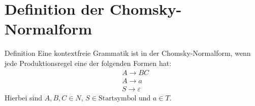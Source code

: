 \documentclass[t]{beamer}
\begin{document}
	\section{Definition der Chomsky-Normalform}\label{sec:chomsky-normal-form-definition}
	\begin{frame}
		\begin{block}{Definition\cite{watrous2020}}
			Eine kontextfreie Grammatik ist in der Chomsky-Normalform, wenn jede Produktionsregel eine der folgenden Formen hat:
			\begin{align*}
				& A \rightarrow BC \\
				& A \rightarrow a \\
				& S \rightarrow \varepsilon
			\end{align*}
			Hierbei sind $A,B,C \in N$, $S \in \text{Startsymbol}$ und $a \in T$.
		\end{block}
	\end{frame}
\end{document}
